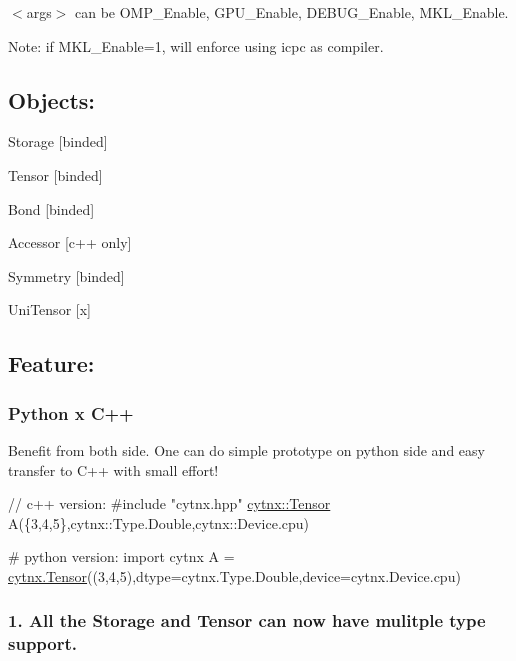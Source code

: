 $<$args$>$ can be O\+M\+P\+\_\+\+Enable, G\+P\+U\+\_\+\+Enable, D\+E\+B\+U\+G\+\_\+\+Enable, M\+K\+L\+\_\+\+Enable.

Note\+: if M\+K\+L\+\_\+\+Enable=1, will enforce using icpc as compiler.

\subsection*{Objects\+:}


\begin{DoxyItemize}
\item Storage \mbox{[}binded\mbox{]}
\item Tensor \mbox{[}binded\mbox{]}
\item Bond \mbox{[}binded\mbox{]}
\item Accessor \mbox{[}c++ only\mbox{]}
\item Symmetry \mbox{[}binded\mbox{]}
\item Uni\+Tensor \mbox{[}x\mbox{]}
\end{DoxyItemize}

\subsection*{Feature\+:}

\subsubsection*{Python x C++}

Benefit from both side. One can do simple prototype on python side and easy transfer to C++ with small effort!


\begin{DoxyCode}
\textcolor{comment}{// c++ version:}
\textcolor{preprocessor}{#include "cytnx.hpp"}
\hyperlink{classcytnx_1_1Tensor}{cytnx::Tensor} A(\{3,4,5\},cytnx::Type.Double,cytnx::Device.cpu)
\end{DoxyCode}



\begin{DoxyCode}
\textcolor{comment}{# python version:}
\textcolor{keyword}{import} cytnx
A =  \hyperlink{classcytnx_1_1Tensor}{cytnx.Tensor}((3,4,5),dtype=cytnx.Type.Double,device=cytnx.Device.cpu)
\end{DoxyCode}


\subsubsection*{1. All the Storage and Tensor can now have mulitple type support.}


